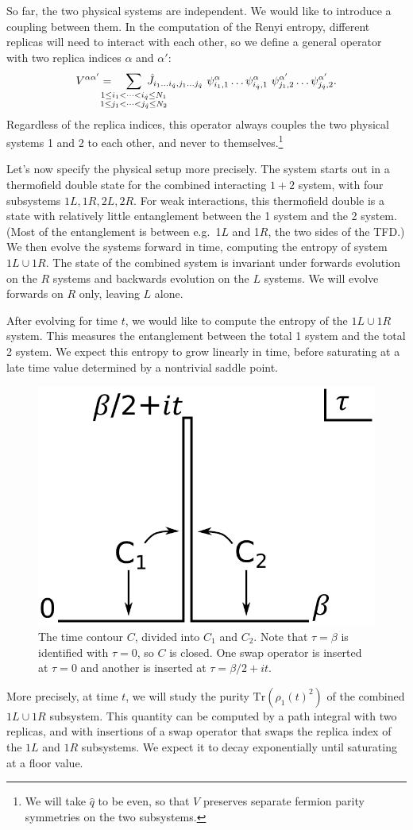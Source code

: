 \documentclass[11pt]{article}
\newcommand{\be}{\begin{equation}}
\newcommand{\ee}{\end{equation}}
\numberwithin{equation}{section}
\def\tr{\text{Tr}}
\begin{document}
So far, the two physical systems are independent. We would like to introduce a coupling between them. In the computation of the Renyi entropy, different replicas will need to interact with each other, so we define a general operator with two replica indices $\alpha$ and $\alpha'$:
\be
V^{\alpha\alpha'} = \hspace{7pt}\hspace{-20pt}\sum_{\substack{1\le i_1<\dots<i_{\hat{q}}\le N_1 \\ 1\le j_1<\dots<j_{\hat{q}}\le N_2}}\hspace{-20pt}\hat{J}_{i_1\dots i_{\hat{q}},j_1\dots j_{\hat{q}}} \ \psi_{i_1,1}^\alpha\dots \psi_{i_{\hat{q}},1}^\alpha \ \psi_{j_1,2}^{\alpha'}\dots \psi_{j_{\hat{q}},2}^{\alpha'}.
\ee
Regardless of the replica indices, this operator always couples the two physical systems 1 and 2 to each other, and never to themselves.\footnote{We will take $\hat{q}$ to be even, so that $V$ preserves separate fermion parity symmetries on the two subsystems.}

Let's now specify the physical setup more precisely. The system starts out in a thermofield double state for the combined interacting $1+2$ system, with four subsystems $1L,1R,2L,2R$. For weak interactions, this thermofield double is a state with relatively little entanglement between the 1 system and the 2 system. (Most of the entanglement is between e.g.~1$L$ and 1$R$, the two sides of the TFD.) We then evolve the systems forward in time, computing the entropy of system $1L\cup 1R$. The state of the combined system is invariant under forwards evolution on the $R$ systems and backwards evolution on the $L$ systems. We will evolve forwards on $R$ only, leaving $L$ alone.

After evolving for time $t$, we would like to compute the entropy of the $1L\cup 1R$ system. This measures the entanglement between the total 1 system and the total 2 system. We expect this entropy to grow linearly in time, before saturating at a late time value determined by a nontrivial saddle point.
\begin{figure}[t]
\begin{center}
\includegraphics[width = .27\textwidth]{images/12.pdf}
\caption{{\small The time contour $C$, divided into $C_1$ and $C_2$. Note that $\tau = \beta$ is identified with $\tau = 0$, so $C$ is closed. One swap operator is inserted at $\tau = 0$ and another is inserted at $\tau = \beta/2+it$.}}\label{timeContour}
\end{center}
\end{figure}
More precisely, at time $t$, we will study the purity $\tr\left(\rho_1(t)^2\right)$ of the combined $1L \cup 1R$ subsystem. This quantity can be computed by a path integral with two replicas, and with insertions of a swap operator that swaps the replica index of the $1L$ and $1R$ subsystems. We expect it to decay exponentially until saturating at a floor value.
\end{document}
